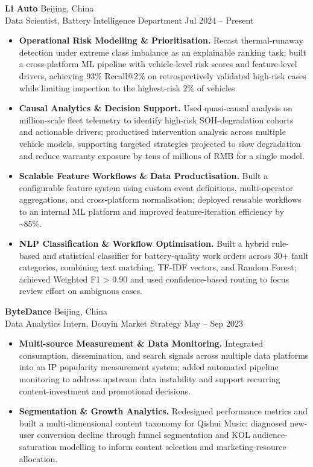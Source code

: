 \documentclass[a4paper,9pt]{article}
\begin{document}
\noindent\textbf{Li Auto} \hfill Beijing, China\\
Data Scientist, Battery Intelligence Department \hfill Jul 2024 -- Present
\begin{itemize}
    \item \textbf{Operational Risk Modelling \& Prioritisation.} Recast thermal-runaway detection under extreme class imbalance as an explainable ranking task; built a cross-platform ML pipeline with vehicle-level risk scores and feature-level drivers, achieving 93\% Recall@2\% on retrospectively validated high-risk cases while limiting inspection to the highest-risk 2\% of vehicles.

    \item \textbf{Causal Analytics \& Decision Support.} Used quasi-causal analysis on million-scale fleet telemetry to identify high-risk SOH-degradation cohorts and actionable drivers; productised intervention analysis across multiple vehicle models, supporting targeted strategies projected to slow degradation and reduce warranty exposure by tens of millions of RMB for a single model.

    \item \textbf{Scalable Feature Workflows \& Data Productisation.} Built a configurable feature system using custom event definitions, multi-operator aggregations, and cross-platform normalisation; deployed reusable workflows to an internal ML platform and improved feature-iteration efficiency by \textasciitilde85\%.

    \item \textbf{NLP Classification \& Workflow Optimisation.} Built a hybrid rule-based and statistical classifier for battery-quality work orders across 30+ fault categories, combining text matching, TF-IDF vectors, and Random Forest; achieved Weighted F1 > 0.90 and used confidence-based routing to focus review effort on ambiguous cases.
\end{itemize}

\vspace{2pt}
\noindent\textbf{ByteDance} \hfill Beijing, China\\
Data Analytics Intern, Douyin Market Strategy \hfill May -- Sep 2023
\begin{itemize}
    \item \textbf{Multi-source Measurement \& Data Monitoring.} Integrated consumption, dissemination, and search signals across multiple data platforms into an IP popularity measurement system; added automated pipeline monitoring to address upstream data instability and support recurring content-investment and promotional decisions.

    \item \textbf{Segmentation \& Growth Analytics.} Redesigned performance metrics and built a multi-dimensional content taxonomy for Qishui Music; diagnosed new-user conversion decline through funnel segmentation and KOL audience-saturation modelling to inform content selection and marketing-resource allocation.
\end{itemize}
\end{document}
